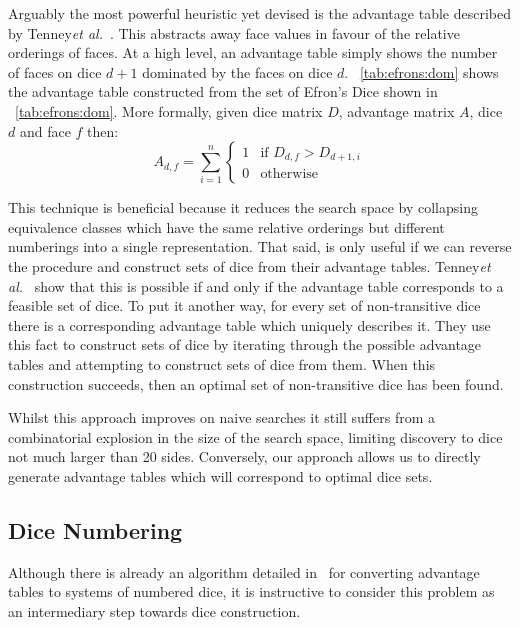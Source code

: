 \documentclass[a4paper,twocolumn]{article}
\begin{document}
Arguably the most powerful heuristic yet devised is the advantage table described by Tenney{\it et al.}~\cite{tenney1976non}. This abstracts away face values in favour of the relative orderings of faces. At a high level, an advantage table simply shows the number of faces on dice $d+1$ dominated by the faces on dice $d$. \tablename~\ref{tab:efrons:dom} shows the advantage table constructed from the set of Efron's Dice shown in \tablename~\ref{tab:efrons:dom}. More formally, given dice matrix $D$, advantage matrix $A$, dice $d$ and face $f$ then: 
\begin{equation}
A_{d,f} = \sum\limits_{i=1}^n \begin{cases}
1 &\text{if $D_{d,f}>D_{d+1, i}$}\\
0 &\text{otherwise}
\end{cases}
\end{equation}

This technique is beneficial because it reduces the search space by collapsing equivalence classes which have the same relative orderings but different numberings into a single representation. That said, is only useful if we can reverse the procedure and construct sets of dice from their advantage tables. Tenney{\it et al.}~\cite{tenney1976non} show that this is possible if and only if the advantage table corresponds to a feasible set of dice. To put it another way, for every set of non-transitive dice there is a corresponding advantage table which uniquely describes it. They use this fact to construct sets of dice by iterating through the possible advantage tables and attempting to construct sets of dice from them. When this construction succeeds, then an optimal set of non-transitive dice has been found.

Whilst this approach improves on naive searches it still suffers from a combinatorial explosion in the size of the search space, limiting discovery to dice not much larger than 20 sides. Conversely, our approach allows us to directly generate advantage tables which will correspond to optimal dice sets.



\subsection*{Dice Numbering}

Although there is already an algorithm detailed in~\cite{tenney1976non} for converting advantage tables to systems of numbered dice, it is instructive to consider this problem as an intermediary step towards dice construction.
\end{document}
